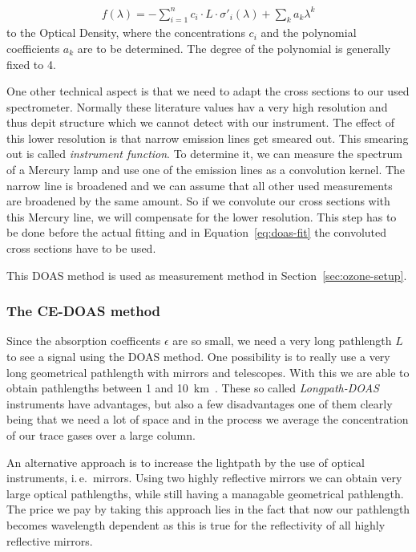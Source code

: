 \begin{align}
  f(\lambda) = - \sum_{i=1}^n c_i \cdot L \cdot \sigma'_i(\lambda) +
  \sum_k a_k \lambda^k \label{eq:doas-fit}
\end{align}
to the Optical Density, where the concentrations $c_i$ and the polynomial
coefficients $a_k$ are to be determined. The degree of the polynomial
is generally fixed to \num{4}.

One other technical aspect is that we need to adapt the cross sections
to our used spectrometer. Normally these literature values hav a very
high resolution and thus depit structure which we cannot detect with
our instrument. The effect of this lower resolution is that narrow
emission lines get smeared out. This smearing out is called
\emph{instrument function}. To determine it, we can measure the
spectrum of a Mercury lamp and use one of the emission lines as a
convolution kernel. The narrow line is broadened and we can assume
that all other used measurements are broadened by the same amount. So
if we convolute our cross sections with this Mercury line, we will
compensate for the lower resolution. This step has to be done before
the actual fitting and in Equation~\eqref{eq:doas-fit} the convoluted
cross sections have to be used.

This DOAS method is used as measurement method in
Section~\ref{sec:ozone-setup}. 

\subsubsection{The CE-DOAS method}
\label{sec:ce-doas}

Since the absorption coefficents $\epsilon$ are so small, we need a
very long pathlength $L$ to see a signal using the DOAS method. One
possibility is to really use a very long geometrical pathlength with
mirrors and telescopes. With this we are able to obtain pathlengths
between \num{1} and \SI{10}{\kilo\meter}~\cite{platt}. These so called
\emph{Longpath-DOAS} instruments have advantages, but also a few
disadvantages one of them clearly being that we need a lot of space
and in the process we average the concentration of our trace gases
over a large column.

An alternative approach is to increase the lightpath by the use of
optical instruments, i.\,e.\ mirrors. Using two highly reflective
mirrors we can obtain very large optical pathlengths, while still
having a managable geometrical pathlength. The price we pay by taking
this approach lies in the fact that now our pathlength becomes
wavelength dependent as this is true for the reflectivity of all
highly reflective mirrors. 

